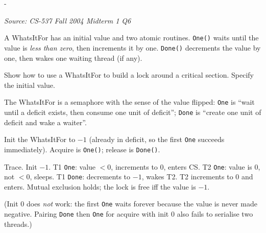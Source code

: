 \documentclass[11pt,a4paper]{article}
\makeatletter
\newcommand{\keepspace}[1]{\par\penalty-100\begingroup
  \setlength{\dimen@}{#1}\dimen@ii\pagegoal\advance\dimen@ii-\pagetotal
  \ifdim\dimen@>\dimen@ii\ifdim\dimen@ii>\z@\vfil\fi\break\fi\endgroup}
\newcounter{qn}[section]
\newenvironment{Qn}[4]{%
  \refstepcounter{qn}\keepspace{7\baselineskip}%
  \begin{tcolorbox}[qboxstyle, title={Q\thesection.\theqn\ \ [#1 \textbar\ #2]\ \ #4}]%
  {\footnotesize\color{g3}\textit{Source: #3}}\par\smallskip%
}{%
  \end{tcolorbox}%
}
\newenvironment{Sol}{%
  \begin{tcolorbox}[sboxstyle, title={Solution}]%
}{%
  \end{tcolorbox}\vspace{0.35em}%
}
\makeatother
\begin{document}
\begin{Qn}{Medium-Hard}{Lect 19}{CS-537 Fall 2004 Midterm 1 Q6}{The WhatsItFor: inverted semaphore as a lock}
A WhatsItFor has an initial value and two atomic routines.
\texttt{One()} waits until the value is \emph{less than zero}, then
increments it by one. \texttt{Done()} decrements the value by one, then
wakes one waiting thread (if any).

Show how to use a WhatsItFor to build a lock around a critical section.
Specify the initial value.
\end{Qn}
\begin{Sol}
The WhatsItFor is a semaphore with the sense of the value flipped:
\texttt{One} is ``wait until a deficit exists, then consume one unit of
deficit''; \texttt{Done} is ``create one unit of deficit and wake a
waiter''.

Init the WhatsItFor to $-1$ (already in deficit, so the first
\texttt{One} succeeds immediately). Acquire is \texttt{One()}; release
is \texttt{Done()}.

Trace. Init $-1$. T1 \texttt{One}: value $< 0$, increments to $0$,
enters CS. T2 \texttt{One}: value is $0$, not $< 0$, sleeps. T1
\texttt{Done}: decrements to $-1$, wakes T2. T2 increments to $0$ and
enters. Mutual exclusion holds; the lock is free iff the value is
$-1$.

(Init $0$ does \emph{not} work: the first \texttt{One} waits forever
because the value is never made negative. Pairing \texttt{Done} then
\texttt{One} for acquire with init $0$ also fails to serialise two
threads.)
\end{Sol}
\end{document}
